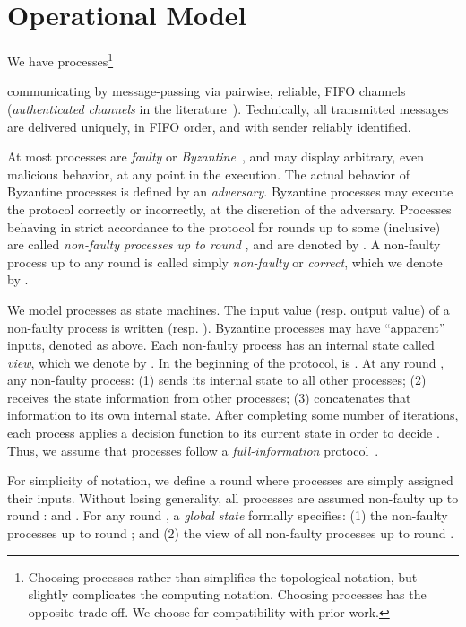\documentclass[11pt]{article}
\begin{document}
\section{Operational Model}
\label{Sec-OperationalModel}

We have  processes\footnote{
Choosing  processes rather than  simplifies the topological notation,
but slightly complicates the computing notation.
Choosing  processes has the opposite trade-off.
We choose  for compatibility with prior work.
}

communicating by message-passing via pairwise, reliable, FIFO channels
(\emph{authenticated channels} in the literature~\cite{RSPBook}).
Technically,
all transmitted messages are delivered uniquely, in FIFO order,
and with sender reliably identified.

At most  processes are \emph{faulty} or \emph{Byzantine}~\cite{Lamport1982},
and may display arbitrary, even malicious behavior, at any point in the execution.
The actual behavior of Byzantine processes
is defined by an \emph{adversary}.
Byzantine processes may execute the protocol correctly or incorrectly,
at the discretion of the adversary.
Processes behaving in strict accordance to the protocol for rounds  up to some  (inclusive)
are called \emph{non-faulty processes up to round },
and are denoted by .
A non-faulty process up to any round  is called simply \emph{non-faulty} or \emph{correct},
which we denote by .

We model processes as state machines.
The input value (resp. output value) of a non-faulty process  is written  (resp. ).
Byzantine processes may have ``apparent'' inputs,
denoted as above.
Each non-faulty process  has an internal state called \emph{view}, which we denote by .
In the beginning of the protocol,  is .
At any round ,
any non-faulty process:
(1) sends its internal state to all other processes;
(2) receives the state information from other processes;
(3) concatenates that information to its own internal state.
After completing some number of iterations,
each process applies a decision function  to its current state in order to decide .
Thus,
we assume that processes follow a \emph{full-information} protocol~\cite{HerlihyRT09}.

For simplicity of notation,
we define a round  where processes are simply assigned their inputs.
Without losing generality,
all processes are assumed non-faulty up to round :
 and .
For any round ,
a \emph{global state} formally specifies:
(1) the non-faulty processes up to round ;
and (2) the view of all non-faulty processes up to round .
\end{document}
